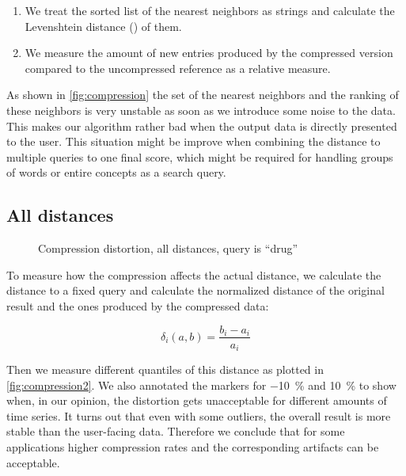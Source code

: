 \begin{enumerate}
    \item We treat the sorted list of the nearest neighbors as strings and calculate the Levenshtein distance (\cite{levenshtein}) of them.
    \item We measure the amount of new entries produced by the compressed version compared to the uncompressed reference as a relative measure.
\end{enumerate}

As shown in \autoref{fig:compression} the set of the nearest neighbors and the ranking of these neighbors is very unstable as soon as we introduce some noise to the data. This makes our algorithm rather bad when the output data is directly presented to the user. This situation might be improve when combining the distance to multiple queries to one final score, which might be required for handling groups of words or entire concepts as a search query.


\subsection{All distances}
\label{ssec:evaluation:distortion:dist}

\begin{figure}
    \centering
    
    \caption[Compression distortion, all distances]{Compression distortion, all distances, query is \enquote{drug}}\label{fig:compression2}
\end{figure}

To measure how the compression affects the actual distance, we calculate the distance to a fixed query and calculate the normalized distance of the original result and the ones produced by the compressed data:

\begin{equation}
    \delta_i(a, b) = \frac{b_i - a_i}{a_i}
\end{equation}

Then we measure different quantiles of this distance as plotted in \autoref{fig:compression2}. We also annotated the markers for \SI{-10}{\percent} and \SI{10}{\percent} to show when, in our opinion, the distortion gets unacceptable for different amounts of time series. It turns out that even with some outliers, the overall result is more stable than the user-facing data. Therefore we conclude that for some applications higher compression rates and the corresponding artifacts can be acceptable.



